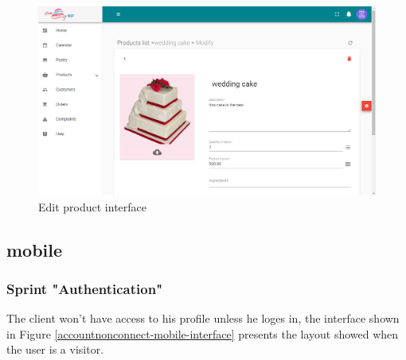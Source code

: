 \documentclass[12pt,a4paper]{report}
\begin{document}
\begin{figure}[H]
	\vspace*{1in}
	\centering
	\includegraphics[width=7in,keepaspectratio]{editproduct.png}
	\caption{Edit product interface}
	\label{editproduct-interface}
\end{figure} 
\clearpage
\subsection{mobile}
\subsubsection*{Sprint "Authentication"}
The client won't have access to his profile unless he loges in, the interface shown in Figure \ref{accountnonconnect-mobile-interface} presents the layout showed when the user is a visitor.
\end{document}
